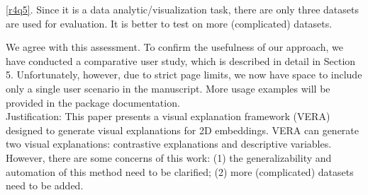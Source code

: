 \documentclass{article}
\newcounter{rtaskno}
\newcommand{\rtask}[1]{\refstepcounter{rtaskno}\label{#1}}
\newcommand{\reviewc}[2]{\begin{leftbar}\noindent\rtask{#1}\ref{#1}. #2\end{leftbar}}
\newcommand{\review}[1]{\begin{leftbar}\noindent #1\end{leftbar}}
\newcommand{\answer}[1]{\noindent #1\\[0mm]}
\newlength{\leftbarwidth}
\newlength{\leftbarsep}
\renewenvironment{leftbar}{%
    \def\FrameCommand{{\color{black}{\vrule width \leftbarwidth\relax\hspace {\leftbarsep}}}}%
    \MakeFramed {\advance \hsize -\width \FrameRestore }%
}{\endMakeFramed}
\begin{document}
\reviewc{r4q5}{Since it is a data analytic/visualization task, there are only three datasets are used for evaluation. It is better to test on more (complicated) datasets.}

\answer{We agree with this assessment. To confirm the usefulness of our approach, we have conducted a comparative user study, which is described in detail in Section 5. Unfortunately, however, due to strict page limits, we now have space to include only a single user scenario in the manuscript. More usage examples will be provided in the package documentation.}


\review{Justification:
This paper presents a visual explanation framework (VERA) designed to generate visual explanations for 2D embeddings. VERA can generate two visual explanations: contrastive explanations and descriptive variables. However, there are some concerns of this work: (1) the generalizability and automation of this method need to be clarified; (2) more (complicated) datasets need to be added.}



\end{document}
